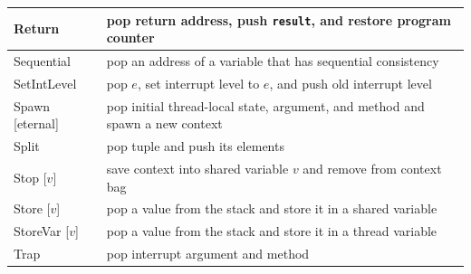 \documentclass{report}
\begin{document}
{\begin{tabular}{|l|l|}
\hline
Return & pop return address, push \texttt{result}, and restore program counter \\
\hline
Sequential & pop an address of a variable that has sequential consistency \\
\hline
SetIntLevel & pop $e$, set interrupt level to $e$, and push old interrupt level \\
\hline
Spawn [eternal] & pop initial thread-local state, argument, and method and spawn a new context \\
\hline
Split & pop tuple and push its elements \\
\hline
Stop [$v$] & save context into shared variable $v$ and remove from context bag \\
\hline
Store [$v$] & pop a value from the stack and store it in a shared variable \\
\hline
StoreVar [$v$] & pop a value from the stack and store it in a thread variable \\
\hline
Trap & pop interrupt argument and method \\
\hline
\end{tabular}
}
\end{document}
